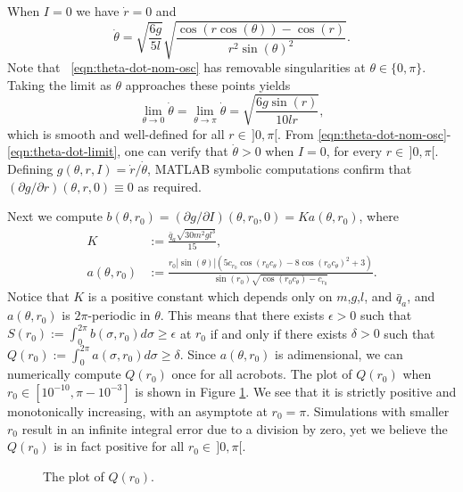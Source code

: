 \documentclass[journal,twoside,web]{ieeecolor}
\begin{document}
{When \(I = 0\) we have \(\dot{r} = 0\) and
\begin{equation} \label{eqn:theta-dot-nom-osc}
    \dot{\theta} = \sqrt{\frac{6g}{5l}} 
        \sqrt{\frac{\cos(r\cos(\theta)) - \cos(r)}
            {r^2 \sin(\theta)^2}}
    .
\end{equation}
Note that ~\eqref{eqn:theta-dot-nom-osc} has removable singularities at
\(\theta \in \{0,\pi\}\).
Taking the limit as \(\theta\) approaches these points yields
\begin{equation}\label{eqn:theta-dot-limit}
    \lim\limits_{\theta \to 0}\dot{\theta} 
    = \lim\limits_{\theta \to \pi} \dot{\theta}
    = \sqrt{\frac{6g \sin(r)}{10lr}}
    , 
\end{equation}
which is smooth and well-defined for all
\(r \in \, ]0,\pi[\).
From \eqref{eqn:theta-dot-nom-osc}-\eqref{eqn:theta-dot-limit},
one can verify that \(\dot{\theta} > 0\) when \(I = 0\), for every 
\(r \in \, ]0,\pi[\).
Defining \(g(\theta,r,I) = \dot{r}/\dot{\theta}\), MATLAB symbolic computations
confirm that \((\partial g/\partial r)(\theta,r,0) \equiv 0\) as required.

Next we compute
\(b(\theta,r_0) = (\partial g/\partial I)(\theta, r_0, 0) = K a(\theta,r_0)\),
where
\begin{align*}
    K &:= \frac{\bar{q}_a \sqrt{30m^2g l^3}}{15}
    , \\
    a(\theta,r_0) &:= \frac{
        r_0 |\sin(\theta)| \left(
        5 c_{r_0} \cos(r_0 c_\theta) - 8 \cos(r_0c_\theta)^2 + 3
    \right)
    }{
    \sin(r_0)\sqrt{\cos(r_0c_\theta) - c_{r_0}}
    }
    .
\end{align*}
Notice that \(K\) is a positive constant which depends only on
\(m\),\(g\),\(l\), and \(\bar{q}_a\), and \(a(\theta,r_0)\) is \(2\pi\)-periodic
in \(\theta\).
This means that there exists \(\epsilon > 0\) such that 
\(S(r_0) := \int_0^{2\pi} b(\sigma,r_0)d\sigma \geq \epsilon\) at \(r_0\)
if and only if there exists \(\delta > 0\) such that 
\(Q(r_0) := \int_0^{2\pi} a(\sigma,r_0) d\sigma \geq \delta\).
Since \(a(\theta,r_0)\) is adimensional, we can numerically compute \(Q(r_0)\)
once for all acrobots.
The plot of \(Q(r_0)\) when \(r_0 \in [10^{-10}, \pi - 10^{-3}]\) is shown in
Figure \ref{fig:acrobot-Q}.
We see that it is strictly positive and monotonically increasing, with an
asymptote at \(r_0 = \pi\).
Simulations with smaller \(r_0\) result in an infinite integral error due to a
division by zero, yet we believe the \(Q(r_0)\) is in fact positive for all 
\(r_0 \in \, ]0,\pi[\).
\begin{figure}
    \centering
    \caption{The plot of \(Q(r_0)\).}
    \label{fig:acrobot-Q}
\end{figure}

}
\end{document}
